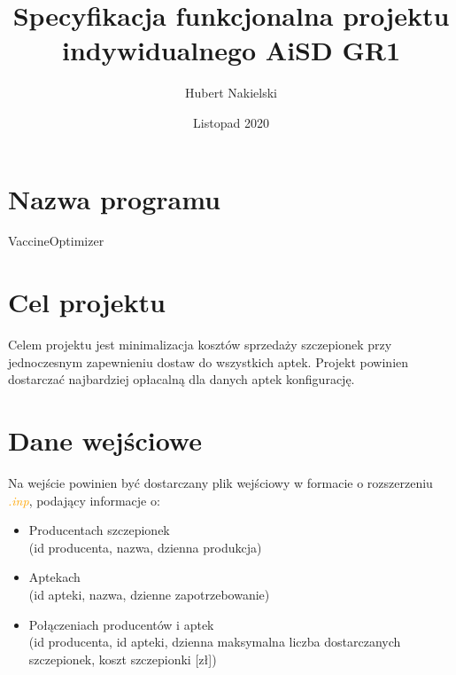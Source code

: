 \documentclass[]{article}
\title{Specyfikacja funkcjonalna projektu indywidualnego \textbf{AiSD GR1}}
\author{Hubert Nakielski}
\date{Listopad 2020}
\begin{document}
\maketitle
\section{Nazwa programu}
VaccineOptimizer
\section{Cel projektu}
Celem projektu jest minimalizacja kosztów sprzedaży szczepionek przy jednoczesnym
 zapewnieniu dostaw do wszystkich aptek. Projekt powinien dostarczać najbardziej opłacalną 
 dla danych aptek konfigurację.
 
\section{Dane wejściowe}
Na wejście powinien być dostarczany plik wejściowy w formacie o rozszerzeniu \textcolor{orange}{\textit{.inp}}, podający informacje o: \\
	\begin{itemize}
		\item
		Producentach szczepionek \\
		(id producenta, nazwa, dzienna produkcja)\\
		\item
		Aptekach\\ (id apteki, nazwa, dzienne zapotrzebowanie)\\
		\item
		Połączeniach producentów i aptek \\(id producenta, id apteki, dzienna maksymalna liczba dostarczanych szczepionek, koszt 
		szczepionki [zł])
	\end{itemize}

\begin{table}[h!]
	\caption{Producenci }
\end{table}
\end{document}
